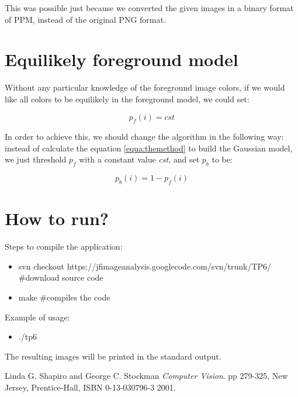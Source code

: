 \documentclass{article}
\begin{document}
	This was possible just because we converted the given images in a binary format of PPM, instead of the original PNG format.

\section{Equilikely foreground model}
	Without any particular knowledge of the foreground image colors, if we would like all colors to be equilikely in the foreground model, we could set:

	\begin{equation}
		p_f(i)=cst
	\end{equation}

	In order to achieve this, we should change the algorithm in the following way: instead of calculate the equation \ref{equa:themethod} to build the Gaussian model, we just threshold {$p_f$} with a constant value \textit{cst}, and set {$p_b$} to be:

	\begin{equation}
	 p_b(i)=1-p_f(i)  
	\end{equation}
	
\section{How to run?}

	Steps to compile the application:
	
	\begin{itemize}
		\item svn checkout https://jfimageanalysis.googlecode.com/svn/trunk/TP6/ \#download source code
		\item make \#compiles the code
	\end{itemize}


	Example of usage:

	\begin{itemize}
		\item ./tp6
	\end{itemize}

	The resulting images will be printed in the standard output.


\begin{thebibliography}{9}

	Linda G. Shapiro and George C. Stockman
 	\emph{Computer Vision}.
	pp 279-325, 
	New Jersey, Prentice-Hall, 
	ISBN 0-13-030796-3
 	2001.

\end{thebibliography}
\end{document}
